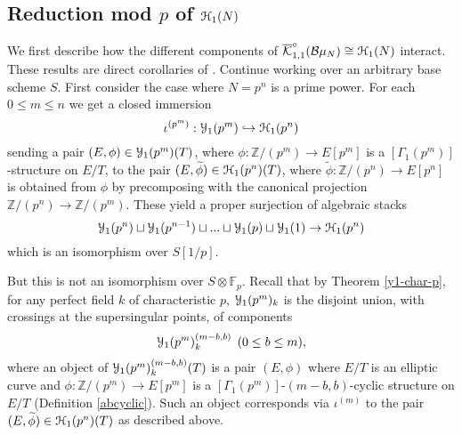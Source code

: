 \documentclass[11pt]{amsart}
\theoremstyle{definition}
\begin{document}
\subsection*{Reduction mod $p$ of ${\mathbf{\EuScript{H}}}_1(N)$}

We first describe how the different components of $\overline{\mathcal{K}}_{1,1}^\circ ({\mathcal{B}} \mu_N) \cong {\mathbf{\EuScript{H}}}_1(N)$ interact. These results are direct corollaries of \cite[\S13.5]{KM1}. Continue working over an arbitrary base scheme $S$. First consider the case where $N=p^n$ is a prime power. For each $0 \leq m \leq n$ we get a closed immersion 
\begin{displaymath}
\iota^{(p^m)}: {\mathbf{\EuScript{Y}}}_1(p^m) \hookrightarrow {\mathbf{\EuScript{H}}}_1(p^n)
\end{displaymath}
sending a pair $(E,\phi) \in {\mathbf{\EuScript{Y}}}_1(p^m)(T)$, where $\phi:\mathbb{Z}/(p^m) \rightarrow E[p^m]$ is a $[\Gamma_1(p^m)]$-structure on $E/T$, to the pair $(E,\widetilde{\phi}) \in {\mathbf{\EuScript{H}}}_1(p^n)(T)$, where $\widetilde{\phi}: \mathbb{Z}/(p^n) \rightarrow E[p^n]$ is obtained from $\phi$ by precomposing with the canonical projection $\mathbb{Z}/(p^n) \rightarrow \mathbb{Z}/(p^m)$. These yield a proper surjection of algebraic stacks
\begin{displaymath}
{\mathbf{\EuScript{Y}}}_1(p^n) \sqcup {\mathbf{\EuScript{Y}}}_1 (p^{n-1}) \sqcup ... \sqcup {\mathbf{\EuScript{Y}}}_1(p) \sqcup {\mathbf{\EuScript{Y}}}_1(1) \rightarrow {\mathbf{\EuScript{H}}}_1(p^n)
\end{displaymath}
which is an isomorphism over $S[1/p]$.

But this is not an isomorphism over $S \otimes \mathbb{F}_p$. Recall that by Theorem \ref{y1-char-p}, for any perfect field $k$ of characteristic $p$, ${\mathbf{\EuScript{Y}}}_1(p^m)_{k}$ is the disjoint union, with crossings at the supersingular points, of components 
\begin{align*}
{\mathbf{\EuScript{Y}}}_1(p^m)_{k}^{(m-b,b)}\:\: (0\leq b \leq m),
\end{align*}
where an object of ${\mathbf{\EuScript{Y}}}_1(p^m)_{k}^{(m-b,b)}(T)$ is a pair $(E,\phi)$ where $E/T$ is an elliptic curve and $\phi:\mathbb{Z}/(p^m) \rightarrow E[p^m]$ is a $[\Gamma_1(p^m)]$-$(m-b,b)$-cyclic structure on $E/T$ (Definition \ref{abcyclic}). Such an object corresponds via $\iota^{(m)}$ to the pair $(E,\widetilde{\phi}) \in {\mathbf{\EuScript{H}}}_1(p^n)(T)$ as described above.
\end{document}
